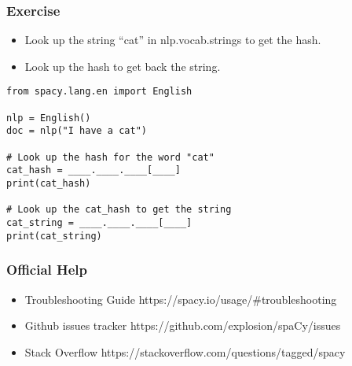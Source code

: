 \begin{frame}[fragile]\frametitle{Exercise}

  \begin{itemize}
    \item Look up the string “cat” in nlp.vocab.strings to get the hash.
    \item Look up the hash to get back the string.
  \end{itemize}
	
	
\begin{lstlisting}
from spacy.lang.en import English

nlp = English()
doc = nlp("I have a cat")

# Look up the hash for the word "cat"
cat_hash = ____.____.____[____]
print(cat_hash)

# Look up the cat_hash to get the string
cat_string = ____.____.____[____]
print(cat_string)
\end{lstlisting}




\end{frame}

\begin{frame}[fragile]\frametitle{Official Help}
  \begin{itemize}
    \item Troubleshooting Guide https://spacy.io/usage/\#troubleshooting
		\item Github issues tracker https://github.com/explosion/spaCy/issues
		\item Stack Overflow  https://stackoverflow.com/questions/tagged/spacy
  \end{itemize}
	
	
\end{frame}